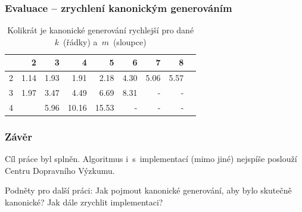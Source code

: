 \documentclass[10pt]{beamer}
\newcommand{\evenrowcolor}{\rowcolor[gray]{0.925}}
\begin{document}
\begin{frame}
	\frametitle{Evaluace -- zrychlení kanonickým generováním}

\begin{table}[H]
	\caption{Kolikrát je kanonické generování rychlejší pro dané $k$~(řádky) a~$m$~(sloupce)}
	\centering
	\begin{tabular}{c|rrrrrrrr}

\toprule

   &         2 &         3 &         4 &         5 &         6 &     7 &     8 \\ \midrule
2  &      1.14 &      1.93 &      1.91 &      2.18 &      4.30 &  5.06 &  5.57 \\
\evenrowcolor
3  &      1.97 &      3.47 &      4.49 &      6.69 &      8.31 &     - &     - \\
4  &           &      5.96 &     10.16 &     15.53 &         - &     - &     - \\

	\end{tabular}
\end{table}

\end{frame}

\begin{frame}
	\frametitle{Závěr}

	Cíl práce byl splněn. Algoritmus i~s~implementací (mimo jiné) nejspíše poslouží Centru Dopravního Výzkumu.
\\
\bigskip

Podněty pro další práci: Jak pojmout kanonické generování, aby bylo skutečně kanonické? Jak dále zrychlit implementaci?


\end{frame}
\end{document}
